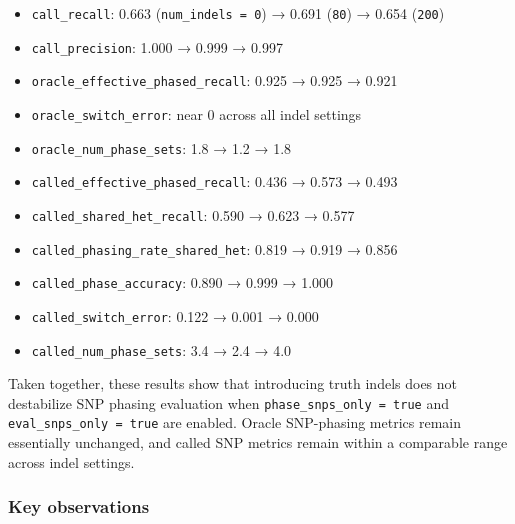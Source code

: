 \documentclass[
]{article}
\providecommand{\tightlist}{%
  \setlength{\itemsep}{0pt}\setlength{\parskip}{0pt}}
\begin{document}
\begin{itemize}
\tightlist
\item
  \texttt{call\_recall}: 0.663 (\texttt{num\_indels\ =\ 0}) → 0.691
  (\texttt{80}) → 0.654 (\texttt{200})
\item
  \texttt{call\_precision}: 1.000 → 0.999 → 0.997
\item
  \texttt{oracle\_effective\_phased\_recall}: 0.925 → 0.925 → 0.921
\item
  \texttt{oracle\_switch\_error}: near 0 across all indel settings
\item
  \texttt{oracle\_num\_phase\_sets}: 1.8 → 1.2 → 1.8
\item
  \texttt{called\_effective\_phased\_recall}: 0.436 → 0.573 → 0.493
\item
  \texttt{called\_shared\_het\_recall}: 0.590 → 0.623 → 0.577
\item
  \texttt{called\_phasing\_rate\_shared\_het}: 0.819 → 0.919 → 0.856
\item
  \texttt{called\_phase\_accuracy}: 0.890 → 0.999 → 1.000
\item
  \texttt{called\_switch\_error}: 0.122 → 0.001 → 0.000
\item
  \texttt{called\_num\_phase\_sets}: 3.4 → 2.4 → 4.0
\end{itemize}

Taken together, these results show that introducing truth indels does
not destabilize SNP phasing evaluation when
\texttt{phase\_snps\_only\ =\ true} and
\texttt{eval\_snps\_only\ =\ true} are enabled. Oracle SNP-phasing
metrics remain essentially unchanged, and called SNP metrics remain
within a comparable range across indel settings.

\subsubsection{Key observations}\label{key-observations-5}
\end{document}
